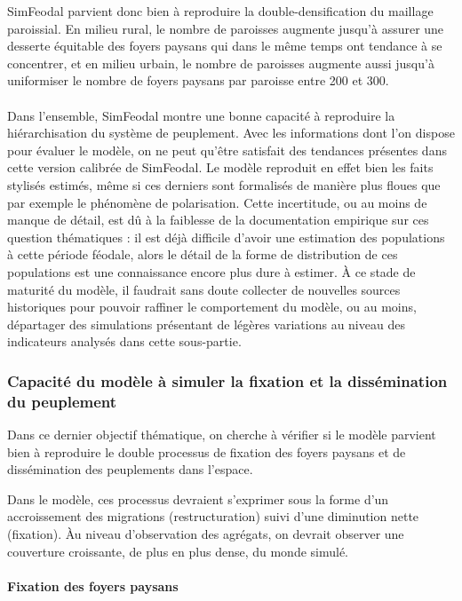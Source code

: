 SimFeodal parvient donc bien à reproduire la double-densification du maillage paroissial.
En milieu rural, le nombre de paroisses augmente jusqu'à assurer une desserte équitable des foyers paysans qui dans le même temps ont tendance à se concentrer, et en milieu urbain, le nombre de paroisses augmente aussi jusqu'à uniformiser le nombre de foyers paysans par paroisse entre 200 et 300.

\bigskip
\paragraph[Conclusion intermédiaire]{}
Dans l'ensemble, SimFeodal montre une bonne capacité à reproduire la hiérarchisation du système de peuplement.
Avec les informations dont l'on dispose pour évaluer le modèle, on ne peut qu'être satisfait des tendances présentes dans cette version calibrée de SimFeodal.
Le modèle reproduit en effet bien les faits stylisés estimés, même si ces derniers sont formalisés de manière plus floues que par exemple le phénomène de polarisation.
Cette incertitude, ou au moins de manque de détail, est dû à la faiblesse de la documentation empirique sur ces question thématiques : il est déjà difficile d'avoir une estimation des populations à cette période féodale, alors le détail de la forme de distribution de ces populations est une connaissance encore plus dure à estimer.
À ce stade de maturité du modèle, il faudrait sans doute collecter de nouvelles sources historiques pour pouvoir raffiner le comportement du modèle, ou au moins, départager des simulations présentant de légères variations au niveau des indicateurs analysés dans cette sous-partie.

\clearpage
\subsubsection{Capacité du modèle à simuler la fixation et la dissémination du peuplement}

Dans ce dernier objectif thématique, on cherche à vérifier si le modèle parvient bien à reproduire le double processus de fixation des foyers paysans et de dissémination des peuplements dans l'espace.

Dans le modèle, ces processus devraient s'exprimer sous la forme d'un accroissement des migrations (restructuration) suivi d'une diminution nette (fixation).
Àu niveau d'observation des agrégats, on devrait observer une couverture croissante, de plus en plus dense, du monde simulé.

\paragraph{Fixation des foyers paysans}

